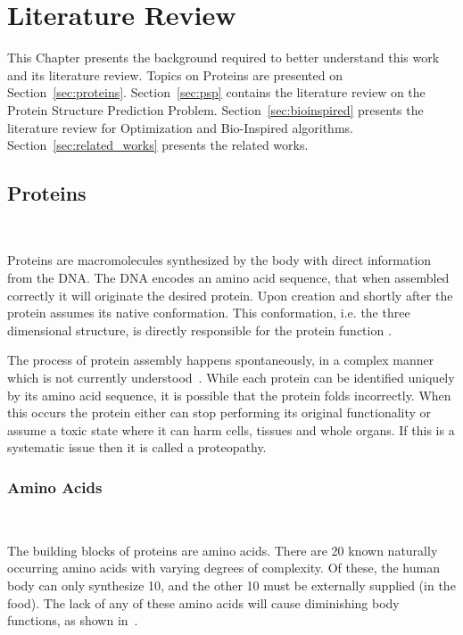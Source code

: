 \chapter{Literature Review}\label{chap:systematic_literature_review}

This Chapter presents the background required to better understand
this work and its literature review. Topics on Proteins are presented on
Section~\ref{sec:proteins}. Section~\ref{sec:psp} contains the literature
review on the Protein Structure Prediction Problem. Section~\ref{sec:bioinspired}
presents the literature review for Optimization and Bio-Inspired algorithms.
Section~\ref{sec:related_works} presents the related works.

\section{Proteins}~\label{sec:proteins}

Proteins are macromolecules synthesized by the body with direct information from
the \ac{DNA}. The \ac{DNA} encodes an amino acid sequence, that when assembled correctly it
will originate the desired protein. Upon creation and shortly after the protein
assumes its native conformation. This conformation, i.e. the three dimensional
structure, is directly responsible for the protein function
\cite{lee2017ab}.

The process of protein assembly happens spontaneously, in a complex manner which
is not currently understood~\cite{dill2008protein}.
While each protein can be identified uniquely by
its amino acid sequence, it is possible that the protein folds incorrectly.
When this occurs the protein either can stop performing its
original functionality or assume a toxic state where it can harm cells,
tissues and whole organs.
If this is a systematic issue then it is called a proteopathy.

\subsection{Amino Acids}~\label{sec:amino-acids}

The building blocks of proteins are amino acids. There are 20 known naturally
occurring amino acids with varying degrees of complexity. Of these, the human
body can only synthesize 10, and the other 10 must be externally supplied
(in the food). The lack of any of these amino acids will cause diminishing
body functions, as shown in~\cite{crews1969weight}.


